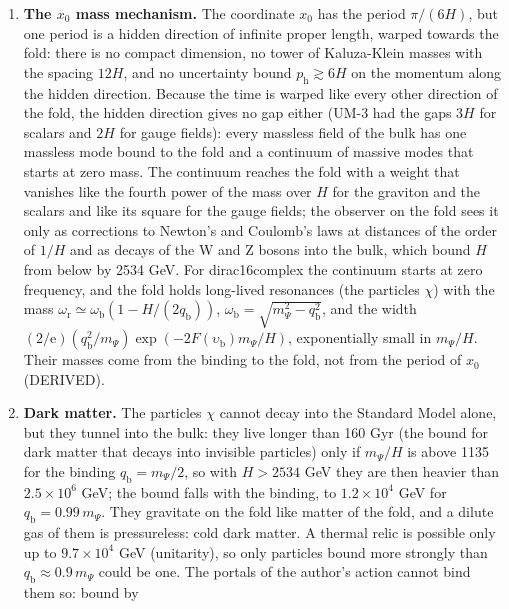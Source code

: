 \documentclass[
  10pt,
]{article}
\providecommand{\tightlist}{%
  \setlength{\itemsep}{0pt}\setlength{\parskip}{0pt}}
\begin{document}
\begin{enumerate}
\def\labelenumi{\arabic{enumi}.}
\tightlist
\item
  \textbf{The \(x_0\) mass mechanism.} The coordinate \(x_0\) has the
  period \(\pi/(6H)\), but one period is a hidden direction of infinite
  proper length, warped towards the fold: there is no compact dimension,
  no tower of Kaluza-Klein masses with the spacing \(12H\), and no
  uncertainty bound \(p_{\mathrm{h}} \gtrsim 6H\) on the momentum along
  the hidden direction. Because the time is warped like every other
  direction of the fold, the hidden direction gives no gap either (UM-3
  had the gaps \(3H\) for scalars and \(2H\) for gauge fields): every
  massless field of the bulk has one massless mode bound to the fold and
  a continuum of massive modes that starts at zero mass. The continuum
  reaches the fold with a weight that vanishes like the fourth power of
  the mass over \(H\) for the graviton and the scalars and like its
  square for the gauge fields; the observer on the fold sees it only as
  corrections to Newton's and Coulomb's laws at distances of the order
  of \(1/H\) and as decays of the W and Z bosons into the bulk, which
  bound \(H\) from below by 2534 GeV. For dirac16complex the continuum
  starts at zero frequency, and the fold holds long-lived resonances
  (the particles \(\chi\)) with the mass
  \(\omega_{\mathrm{r}} \simeq \omega_{\mathrm{b}}(1 - H/(2q_{\mathrm{b}}))\),
  \(\omega_{\mathrm{b}} = \sqrt{m_\Psi^2 - q_{\mathrm{b}}^2}\), and the
  width
  \((2/\mathrm{e})(q_{\mathrm{b}}^2/m_\Psi)\exp(-2F(\upsilon_{\mathrm{b}})m_\Psi/H)\),
  exponentially small in \(m_\Psi/H\). Their masses come from the
  binding to the fold, not from the period of \(x_0\) (DERIVED).
\item
  \textbf{Dark matter.} The particles \(\chi\) cannot decay into the
  Standard Model alone, but they tunnel into the bulk: they live longer
  than 160 Gyr (the bound for dark matter that decays into invisible
  particles) only if \(m_\Psi/H\) is above 1135 for the binding
  \(q_{\mathrm{b}} = m_\Psi/2\), so with \(H > 2534\) GeV they are then
  heavier than \(2.5\times10^6\) GeV; the bound falls with the binding,
  to \(1.2\times10^4\) GeV for \(q_{\mathrm{b}} = 0.99\,m_\Psi\). They
  gravitate on the fold like matter of the fold, and a dilute gas of
  them is pressureless: cold dark matter. A thermal relic is possible
  only up to \(9.7\times10^4\) GeV (unitarity), so only particles bound
  more strongly than \(q_{\mathrm{b}} \approx 0.9\,m_\Psi\) could be
  one. The portals of the author's action cannot bind them so: bound by

\end{enumerate}
\end{document}
